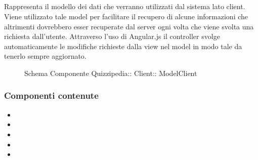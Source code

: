 \subsection{}
Rappresenta il modello dei dati che verranno utilizzati dal sistema lato client. Viene utilizzato tale model per facilitare il recupero di alcune informazioni che altrimenti dovrebbero esser recuperate dal server ogni volta che viene svolta una richiesta dall'utente.
Attraverso l'uso di Angular.js il controller svolge automaticamente le modifiche richieste dalla view nel model in modo tale da tenerlo sempre aggiornato.
\begin{figure}[H]
\centering
\noindent{}
\caption[Schema Componente ModelClient]{Schema Componente Quizzipedia:: Client:: ModelClient}
\end{figure}
\subsubsection{Componenti contenute}
\begin{itemize}
\item {}
\item {}
\item {}
\item {}
\item {}
\end{itemize}
